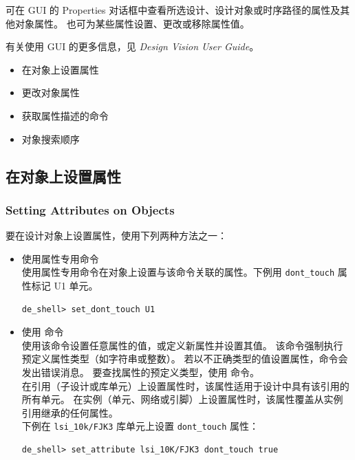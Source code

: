 可在 GUI 的 Properties 对话框中查看所选设计、设计对象或时序路径的属性及其他对象属性。
也可为某些属性设置、更改或移除属性值。

有关使用 GUI 的更多信息，见 \textit{Design Vision User Guide}。

\begin{seeAlsoBox}
\begin{itemize}
  \item 在对象上设置属性
  \item 更改对象属性
  \item 获取属性描述的命令
  \item 对象搜索顺序
\end{itemize}
\end{seeAlsoBox}

\subsection{在对象上设置属性}
\subsubsection*{Setting Attributes on Objects}

要在设计对象上设置属性，使用下列两种方法之一：
\begin{itemize}
  \item 使用属性专用命令\\
        使用属性专用命令在对象上设置与该命令关联的属性。下例用 \texttt{dont\_touch} 属性标记 U1 单元。
\begin{lstlisting}
de_shell> set_dont_touch U1
\end{lstlisting}
  \item 使用  命令\\
        使用该命令设置任意属性的值，或定义新属性并设置其值。
        该命令强制执行预定义属性类型（如字符串或整数）。
        若以不正确类型的值设置属性，命令会发出错误消息。
        要查找属性的预定义类型，使用  命令。\\
        在引用（子设计或库单元）上设置属性时，该属性适用于设计中具有该引用的所有单元。
        在实例（单元、网络或引脚）上设置属性时，该属性覆盖从实例引用继承的任何属性。\\
        下例在 \texttt{lsi\_10k/FJK3} 库单元上设置 \texttt{dont\_touch} 属性：
\begin{lstlisting}
de_shell> set_attribute lsi_10K/FJK3 dont_touch true
\end{lstlisting}
\end{itemize}

